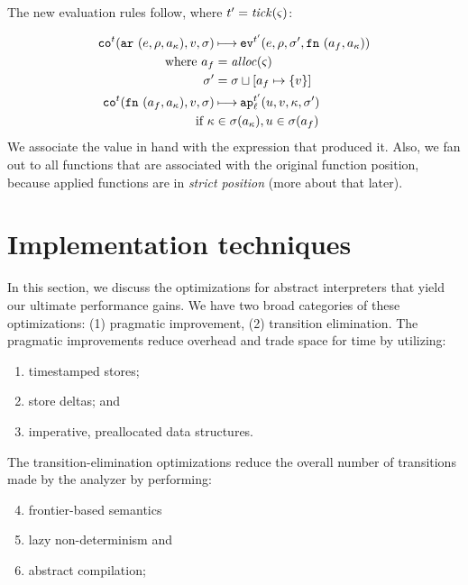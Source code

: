 \documentclass[preprint,onecolumn,9pt]{sigplanconf} %
\begin{document}
The new evaluation rules follow, where ${t}' = \mathit{tick}(\varsigma)$:

\newcommand{\ext}[3]{#1\sqcup[#2\mapsto#3]}

\begin{align*}
\co[^\mcntr]{\kar{\mexp,\menv,\maddr_\mkont},\mval,\msto} & \machstep
\ev[^{\mcntr'}]{\mexp,\menv,\msto',\kfn{\maddr_f,\maddr_\mkont}} \\
\text{ where }
  \maddr_f &= \alloc(\mstate) \\
  \msto' &= \ext{\msto}{\maddr_f}{\{\mval\}}
\\
\co[^\mcntr]{\kfn{\maddr_f,\maddr_\mkont},\mval,\msto} & \machstep
\ap[^{\mcntr'}_\mlab]{\mvalx{u},\mval,\mkont,\msto'}
\\
\text{ if } \mkont &\in \msto(\maddr_\mkont), \mvalx{u} \in \msto(\maddr_f)
\end{align*}
We associate the value in hand with the expression that produced
it. Also, we fan out to all functions that are associated with the
original function position, because applied functions are in
\emph{strict position} (more about that later).



\section{Implementation techniques}
\label{sec:opt}

In this section, we discuss the optimizations for abstract interpreters that
yield our ultimate performance gains.
%
We have two broad categories of these optimizations: (1) pragmatic
improvement, (2) transition elimination.
%
The pragmatic improvements reduce overhead and trade space for time
by utilizing:
\begin{enumerate}
 \item timestamped stores;
 \item store deltas; and
 \item imperative, preallocated data structures.
\end{enumerate}
The transition-elimination optimizations reduce the overall number of transitions
made by the analyzer by performing:
\begin{enumerate}
  \setcounter{enumi}{3}
 \item frontier-based semantics
 \item lazy non-determinism and
 \item abstract compilation;
\end{enumerate}
\end{document}
